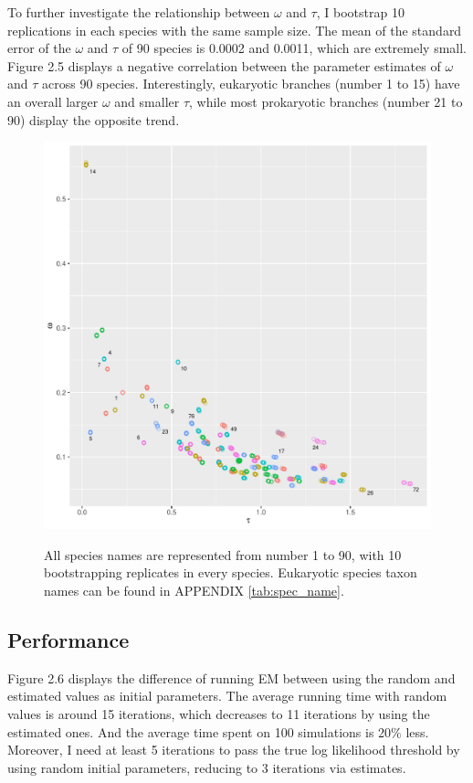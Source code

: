 \indent To further investigate the relationship between $\omega$ and $\tau$, I bootstrap 10 replications in each species with the same sample size. The mean of the standard error of the $\omega$
and $\tau$ of 90 species is 0.0002 and 0.0011, which are extremely small. Figure 2.5 displays a negative correlation between the parameter estimates of $\omega$ and $\tau$ across 90 species. Interestingly, eukaryotic branches (number 1 to 15) have an overall larger $\omega$ and smaller $\tau$, while most prokaryotic branches (number 21 to 90) display the opposite trend. 

\begin{figure}[H]
     \begin{minipage}[t]{1\textwidth }
     \centering
     \includegraphics[width=\linewidth]{Fig5.pdf}
     {{All species names are represented from number 1 to 90, with 10 bootstrapping replicates in every species. Eukaryotic species taxon names can be found in APPENDIX \ref{tab:spec_name}.} 
      \par}
     \end{minipage}
\end{figure}
  
\subsection{Performance}
Figure 2.6 displays the difference of running EM between using the random and estimated values as initial parameters. The average running time with random values is around 15 iterations, which decreases to 11 iterations by using the estimated ones. And the average time spent on 100 simulations is 20$\%$ less. Moreover, I need at least 5 iterations to pass the true log likelihood threshold by using random initial parameters, reducing to 3 iterations via estimates.  

